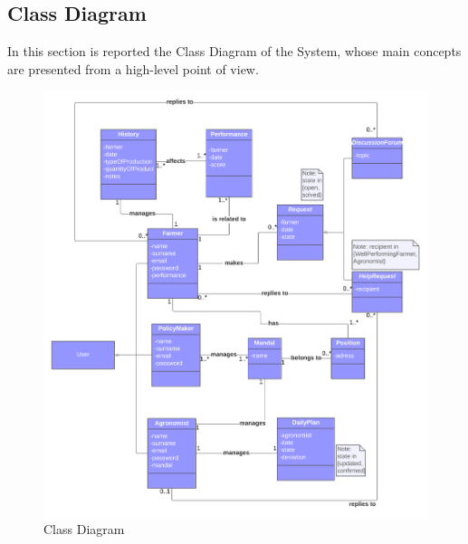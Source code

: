 \subsection{Class Diagram}
In this section is reported the Class Diagram of the System, whose main concepts are presented from a high-level point of view. 

\begin{figure}[h!]
  \includegraphics[width=\textwidth,height=\textheight,keepaspectratio]{./Images/Class Diagram DREAM.png}
  \caption{Class Diagram}
\end{figure}
\newpage


